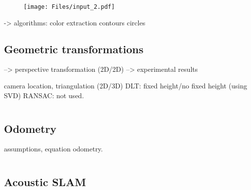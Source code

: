 \begin{figure}[H]

	\centering
   \texttt{[image: Files/input\_2.pdf]}
\end{figure}

-> algorithms:
color extraction
contours
circles

\subsection{Geometric transformations}



--> perspective transformation (2D/2D) 
--> experimental results

camera location, triangulation (2D/3D) 
DLT: fixed height/no fixed height (using SVD)
RANSAC: not used. 



\begin{lstlisting}[caption=Listing]
\end{lstlisting}


\subsection{Odometry}

assumptions, equation odometry.
\begin{lstlisting}[caption=Listing]
\end{lstlisting}

\subsection{Acoustic SLAM}  
\begin{lstlisting}[caption=Listing]
\end{lstlisting}